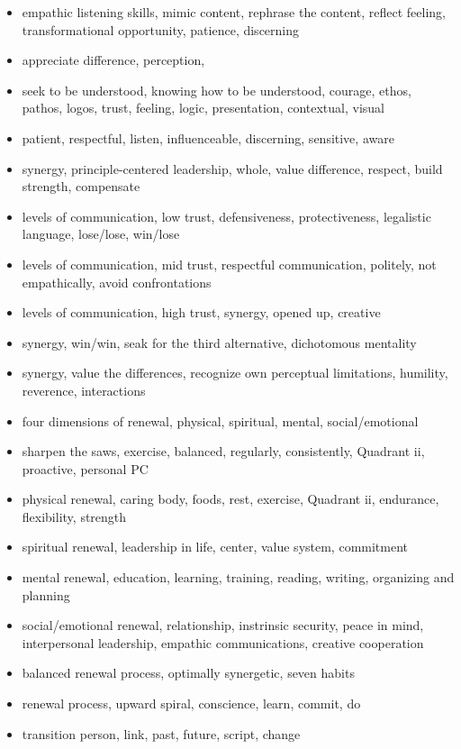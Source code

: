 \documentclass[11pt]{article}
\begin{document}
\begin{itemize}
\item empathic listening skills, mimic content, rephrase the content, reflect feeling, transformational opportunity, patience, discerning
\item appreciate difference, perception, 
\item seek to be understood, knowing how to be understood, courage, ethos, pathos, logos, trust, feeling, logic, presentation, contextual, visual
\item patient, respectful, listen, influenceable, discerning, sensitive, aware
\item synergy, principle-centered leadership, whole, value difference, respect, build strength, compensate
\item levels of communication, low trust, defensiveness, protectiveness, legalistic language, lose/lose, win/lose
\item levels of communication, mid trust, respectful communication, politely, not empathically, avoid confrontations
\item levels of communication, high trust, synergy, opened up, creative
\item synergy, win/win, seak for the third alternative, dichotomous mentality
\item synergy, value the differences, recognize own perceptual limitations, humility, reverence, interactions
\item four dimensions of renewal, physical, spiritual, mental, social/emotional
\item sharpen the saws, exercise, balanced, regularly, consistently, Quadrant ii, proactive, personal PC
\item physical renewal, caring body, foods, rest, exercise, Quadrant ii, endurance, flexibility, strength
\item spiritual renewal, leadership in life, center, value system, commitment
\item mental renewal, education, learning, training, reading, writing, organizing and planning
\item social/emotional renewal, relationship, instrinsic security,  peace in mind, interpersonal leadership, empathic communications, creative cooperation
\item balanced renewal process, optimally synergetic, seven habits
\item renewal process, upward spiral, conscience, learn, commit, do
\item transition person, link, past, future, script, change
\end{itemize}
\end{document}
